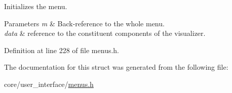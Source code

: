 Initializes the menu. 


\begin{DoxyParams}{Parameters}
{\em m} & Back-\/reference to the whole menu. \\
\hline
{\em data} & reference to the constituent components of the visualizer. \\
\hline
\end{DoxyParams}


Definition at line 228 of file menus.\+h.



The documentation for this struct was generated from the following file\+:\begin{DoxyCompactItemize}
\item 
core/user\+\_\+interface/\hyperlink{menus_8h}{menus.\+h}\end{DoxyCompactItemize}
